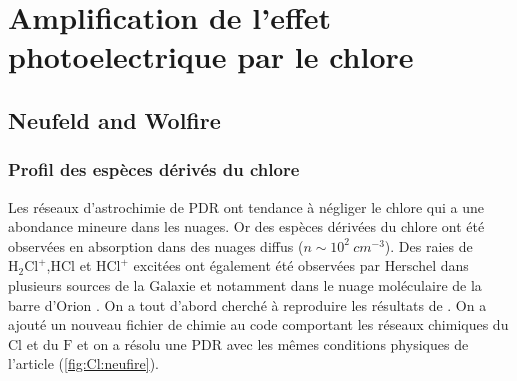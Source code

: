 


\section{Amplification de l'effet photoelectrique par le chlore}

\subsection{Neufeld and Wolfire}
\subsubsection{Profil des espèces dérivés du chlore}

Les réseaux d'astrochimie de PDR ont tendance à négliger le chlore qui a une abondance mineure dans les nuages. Or des espèces dérivées du chlore ont été observées en absorption dans des nuages diffus ($n \sim 10^2\ cm^{-3}$). Des raies de $\mathrm{H}_2\mathrm{Cl}^+$,HCl et $\mathrm{HCl}^+$ excitées ont également été observées par Herschel dans plusieurs sources de la Galaxie et notamment dans le nuage moléculaire de la barre d'Orion \cite{Neufeld2012,Neufire2009}. On a tout d'abord cherché à reproduire les résultats de \cite{Neufire2009} . On a ajouté un nouveau fichier de chimie au code comportant les réseaux chimiques du $\mathrm{Cl}$ et du $\mathrm{F}$ et on a résolu une PDR avec les mêmes conditions physiques de l'article (\ref{fig:Cl:neufire}).


